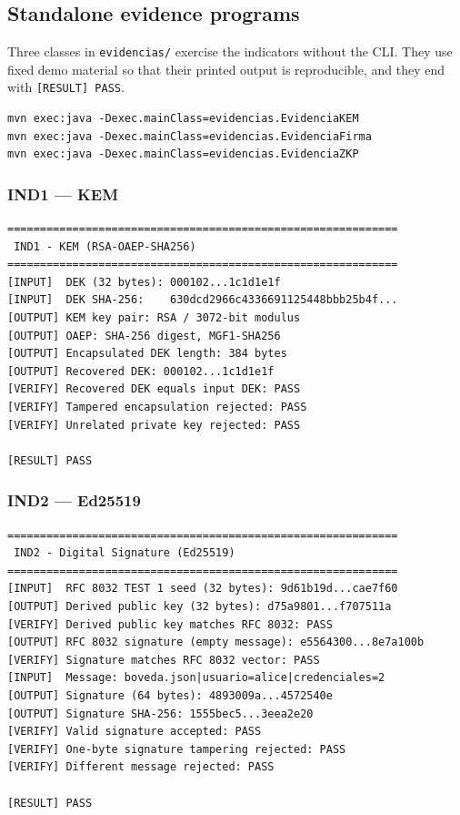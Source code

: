 \documentclass[11pt,a4paper]{article}
\newcommand{\code}[1]{\texttt{#1}}
\begin{document}
\subsection{Standalone evidence programs}

Three classes in \code{evidencias/} exercise the indicators without the CLI. They
use fixed demo material so that their printed output is reproducible, and they
end with \code{[RESULT] PASS}.

\begin{lstlisting}[style=bash,caption={Running the evidence programs.},label={lst:evidence}]
mvn exec:java -Dexec.mainClass=evidencias.EvidenciaKEM
mvn exec:java -Dexec.mainClass=evidencias.EvidenciaFirma
mvn exec:java -Dexec.mainClass=evidencias.EvidenciaZKP
\end{lstlisting}

\subsubsection{IND1 --- KEM}

\begin{lstlisting}[style=plaincode,caption={IND1 output (abridged).},label={lst:ind1}]
============================================================
 IND1 - KEM (RSA-OAEP-SHA256)
============================================================
[INPUT]  DEK (32 bytes): 000102...1c1d1e1f
[INPUT]  DEK SHA-256:    630dcd2966c4336691125448bbb25b4f...
[OUTPUT] KEM key pair: RSA / 3072-bit modulus
[OUTPUT] OAEP: SHA-256 digest, MGF1-SHA256
[OUTPUT] Encapsulated DEK length: 384 bytes
[OUTPUT] Recovered DEK: 000102...1c1d1e1f
[VERIFY] Recovered DEK equals input DEK: PASS
[VERIFY] Tampered encapsulation rejected: PASS
[VERIFY] Unrelated private key rejected: PASS

[RESULT] PASS
\end{lstlisting}

\subsubsection{IND2 --- Ed25519}

\begin{lstlisting}[style=plaincode,caption={IND2 output (abridged).},label={lst:ind2}]
============================================================
 IND2 - Digital Signature (Ed25519)
============================================================
[INPUT]  RFC 8032 TEST 1 seed (32 bytes): 9d61b19d...cae7f60
[OUTPUT] Derived public key (32 bytes): d75a9801...f707511a
[VERIFY] Derived public key matches RFC 8032: PASS
[OUTPUT] RFC 8032 signature (empty message): e5564300...8e7a100b
[VERIFY] Signature matches RFC 8032 vector: PASS
[INPUT]  Message: boveda.json|usuario=alice|credenciales=2
[OUTPUT] Signature (64 bytes): 4893009a...4572540e
[OUTPUT] Signature SHA-256: 1555bec5...3eea2e20
[VERIFY] Valid signature accepted: PASS
[VERIFY] One-byte signature tampering rejected: PASS
[VERIFY] Different message rejected: PASS

[RESULT] PASS
\end{lstlisting}
\end{document}
